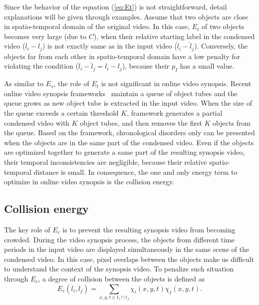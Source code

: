 \documentclass[11pt]{hyu_thesis}
\begin{document}
Since the behavior of the equation (\ref{eq:Et}) is not straightforward, detail explanations will be given through examples. Assume that two objects are close in spatio-temporal domain of the original video. In this case, $E_t$ of two objects becomes very large (due to $C$), when their relative starting label in the condensed video ($l_i - l_j$) is not exactly same as in the input video ($\hat{l}_i - \hat{l}_j$). Conversely, the objects far from each other in spatio-temporal domain have a low penalty for violating the condition ($\hat{l}_i - \hat{l}_j = l_i - l_j$), because their $p_I$ has a small value.

As similar to $E_s$, the role of $E_t$ is not significant in online video synopsis. Recent online video synopsis frameworks~\cite{} maintain a queue of object tubes and the queue grows as new object tube is extracted in the input video. When the size of the queue exceeds a certain threshold $K$, framework generates a partial condensed video with $K$ object tubes, and then removes the first $K$ objects from the queue. Based on the framework, chronological disorders only can be presented when the objects are in the same part of the condensed video. Even if the objects are optimized together to generate a same part of the resulting synopsis video, their temporal inconsistencies are negligible, because their relative spatio-temporal distance is small. In consequence, the one and only energy term to optimize in online video synopsis is the collision energy.

\subsection{Collision energy}
The key role of $E_c$ is to prevent the resulting synopsis video from becoming crowded. During the video synopsis process, the objects from different time periods in the input video are displayed simultaneously in the same scene of the condensed video. In this case, pixel overlaps between the objects make us difficult to understand the context of the synopsis video. To penalize such situation through $E_c$, a degree of collision between the objects is defined as
\begin{equation}
\label{eq:Ec}
E_c(l_i,l_j)=\sum_{x,y,t \in t_i \cap t_j} \chi_i(x,y,t) \chi_j(x,y,t).
\end{equation}
\end{document}
